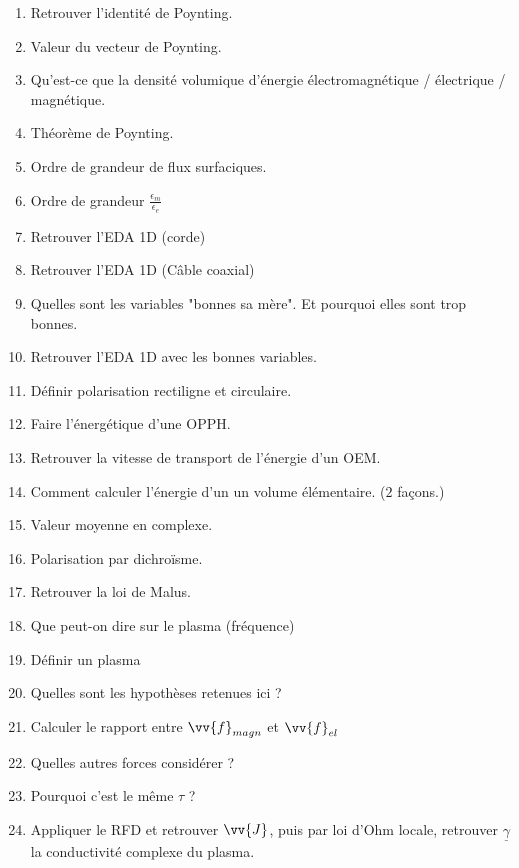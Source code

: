 \documentclass[a4paper, 11pt, hidelinks]{article}
\begin{document}
\begin{enumerate}
    \item Retrouver l'identité de Poynting. \cite{Chapitre14}
    \item Valeur du vecteur de Poynting. \cite{Chapitre14}
    \item Qu'est-ce que la densité volumique d'énergie électromagnétique / électrique / magnétique. \cite{Chapitre14}
    \item Théorème de Poynting. \cite{Chapitre14}
    \item Ordre de grandeur de flux surfaciques. \cite{Chapitre14}
    \item Ordre de grandeur $\frac{\epsilon_m}{\epsilon_e}$ \cite{Chapitre14}
    \item Retrouver l'EDA 1D (corde) \cite{Chapitre15}
    \item Retrouver l'EDA 1D (Câble coaxial) \cite{Chapitre15}
    \item Quelles sont les variables "bonnes sa mère". Et pourquoi elles sont trop bonnes. \cite{Chapitre15}
    \item Retrouver l'EDA 1D avec les bonnes variables. \cite{Chapitre15}
    \item Définir polarisation rectiligne et circulaire. \cite{Chapitre15}
    \item Faire l'énergétique d'une OPPH. \cite{Chapitre15}
    \item Retrouver la vitesse de transport de l'énergie d'un OEM. \cite{Chapitre15}
    \item Comment calculer l'énergie d'un un volume élémentaire. ($2$ façons.) \cite{Chapitre15}
    \item Valeur moyenne en complexe. \cite{Chapitre15}
    \item Polarisation par dichroïsme. \cite{Chapitre15}
    \item Retrouver la loi de Malus. \cite{Chapitre15}
    \item Que peut-on dire sur le plasma (fréquence) \cite{Chapitre16}
    \item Définir un plasma \cite{Chapitre16}
    \item Quelles sont les hypothèses retenues ici ? \cite{Chapitre16}
    \item Calculer le rapport entre $\vv{f}_{magn}$ et $\vv{f}_{el}$ \cite{Chapitre16}
    \item Quelles autres forces considérer ? \cite{Chapitre16}
    \item Pourquoi c'est le même $\tau$ ? \cite{Chapitre16}
    \item Appliquer le RFD et retrouver $\vv{J}$, puis par loi d'Ohm locale, retrouver $\underline{\gamma}$ la conductivité complexe du plasma. \cite{Chapitre16}

\end{enumerate}
\end{document}
